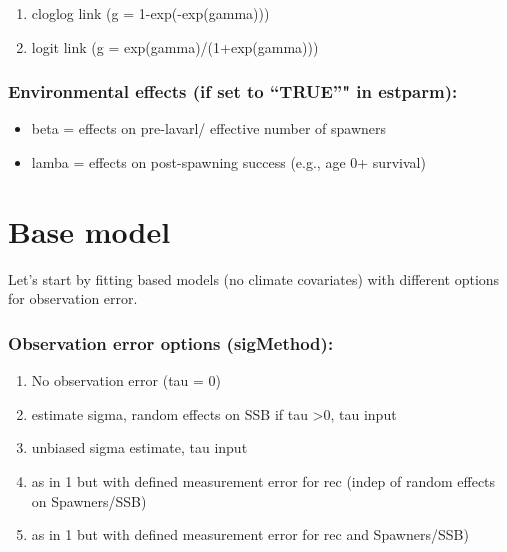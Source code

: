 \documentclass[
]{article}
\providecommand{\tightlist}{%
  \setlength{\itemsep}{0pt}\setlength{\parskip}{0pt}}
\begin{document}
\begin{enumerate}
\def\labelenumi{\arabic{enumi}.}
\tightlist
\item
  cloglog link (g = 1-exp(-exp(gamma)))
\item
  logit link (g = exp(gamma)/(1+exp(gamma)))
\end{enumerate}

\hypertarget{environmental-effects-if-set-to-true-in-estparm}{%
\subsubsection{Environmental effects (if set to ``TRUE''" in
estparm):}\label{environmental-effects-if-set-to-true-in-estparm}}

\begin{itemize}
\tightlist
\item
  beta = effects on pre-lavarl/ effective number of spawners
\item
  lamba = effects on post-spawning success (e.g., age 0+ survival)
\end{itemize}

\hypertarget{base-model}{%
\section{Base model}\label{base-model}}

Let's start by fitting based models (no climate covariates) with
different options for observation error.

\hypertarget{observation-error-options-sigmethod-1}{%
\subsubsection{Observation error options
(sigMethod):}\label{observation-error-options-sigmethod-1}}

\begin{enumerate}
\def\labelenumi{\arabic{enumi}.}
\setcounter{enumi}{-1}
\tightlist
\item
  No observation error (tau = 0)
\item
  estimate sigma, random effects on SSB if tau \textgreater0, tau input
\item
  unbiased sigma estimate, tau input
\item
  as in 1 but with defined measurement error for rec (indep of random
  effects on Spawners/SSB)
\item
  as in 1 but with defined measurement error for rec and Spawners/SSB)
\end{enumerate}
\end{document}
